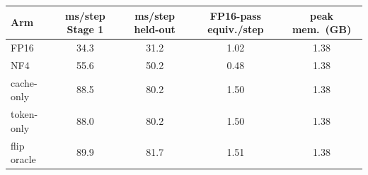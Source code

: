 \begin{tabular}{lcccc}
\toprule
Arm & ms/step Stage 1 & ms/step held-out & FP16-pass equiv./step & peak mem.\ (GB) \\
\midrule
FP16 & 34.3 & 31.2 & 1.02 & 1.38 \\
NF4 & 55.6 & 50.2 & 0.48 & 1.38 \\
cache-only & 88.5 & 80.2 & 1.50 & 1.38 \\
token-only & 88.0 & 80.2 & 1.50 & 1.38 \\
flip oracle & 89.9 & 81.7 & 1.51 & 1.38 \\
\bottomrule
\end{tabular}
